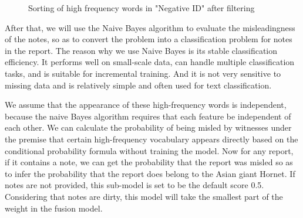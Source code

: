 \documentclass{mcmthesis}
\numberwithin{figure}{section}
\numberwithin{table}{section}
\begin{document}
\begin{figure}[H]
  \caption{Sorting of high frequency words in "Negative ID" after filtering}\label{sohfwaf}
\end{figure}

After that, we will use the Naive Bayes algorithm to evaluate the misleadingness of the notes, so as to convert the problem into a classification problem for notes in the report. The reason why we use Naive Bayes is its stable classification efficiency. It performs well on small-scale data, can handle multiple classification tasks, and is suitable for incremental training. And it is not very sensitive to missing data and is relatively simple and often used for text classification.

We assume that the appearance of these high-frequency words is independent, because the naive Bayes algorithm requires that each feature be independent of each other. We can calculate the probability of being misled by witnesses under the premise that certain high-frequency vocabulary appears directly based on the conditional probability formula without training the model. Now for any report, if it contains a note, we can get the probability that the report was misled so as to infer the probability that the report does belong to the Asian giant Hornet. If notes are not provided,  this sub-model is set to be the default score 0.5. Considering that notes are dirty, this model will take the smallest part of the weight in the fusion model.
\end{document}

